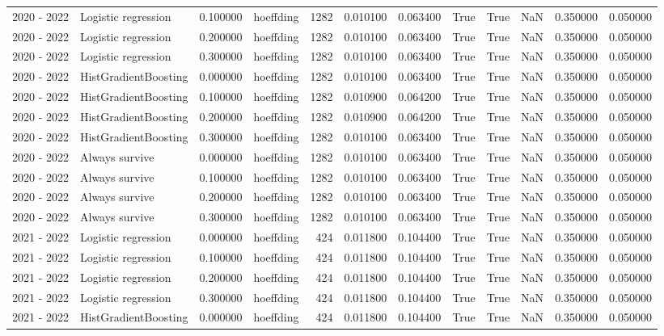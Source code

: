 \begin{tabular}{llrlrrrrrrrr}
2020 - 2022 & Logistic regression & 0.100000 & hoeffding & 1282 & 0.010100 & 0.063400 & True & True & NaN & 0.350000 & 0.050000 \\
2020 - 2022 & Logistic regression & 0.200000 & hoeffding & 1282 & 0.010100 & 0.063400 & True & True & NaN & 0.350000 & 0.050000 \\
2020 - 2022 & Logistic regression & 0.300000 & hoeffding & 1282 & 0.010100 & 0.063400 & True & True & NaN & 0.350000 & 0.050000 \\
2020 - 2022 & HistGradientBoosting & 0.000000 & hoeffding & 1282 & 0.010100 & 0.063400 & True & True & NaN & 0.350000 & 0.050000 \\
2020 - 2022 & HistGradientBoosting & 0.100000 & hoeffding & 1282 & 0.010900 & 0.064200 & True & True & NaN & 0.350000 & 0.050000 \\
2020 - 2022 & HistGradientBoosting & 0.200000 & hoeffding & 1282 & 0.010900 & 0.064200 & True & True & NaN & 0.350000 & 0.050000 \\
2020 - 2022 & HistGradientBoosting & 0.300000 & hoeffding & 1282 & 0.010100 & 0.063400 & True & True & NaN & 0.350000 & 0.050000 \\
2020 - 2022 & Always survive & 0.000000 & hoeffding & 1282 & 0.010100 & 0.063400 & True & True & NaN & 0.350000 & 0.050000 \\
2020 - 2022 & Always survive & 0.100000 & hoeffding & 1282 & 0.010100 & 0.063400 & True & True & NaN & 0.350000 & 0.050000 \\
2020 - 2022 & Always survive & 0.200000 & hoeffding & 1282 & 0.010100 & 0.063400 & True & True & NaN & 0.350000 & 0.050000 \\
2020 - 2022 & Always survive & 0.300000 & hoeffding & 1282 & 0.010100 & 0.063400 & True & True & NaN & 0.350000 & 0.050000 \\
2021 - 2022 & Logistic regression & 0.000000 & hoeffding & 424 & 0.011800 & 0.104400 & True & True & NaN & 0.350000 & 0.050000 \\
2021 - 2022 & Logistic regression & 0.100000 & hoeffding & 424 & 0.011800 & 0.104400 & True & True & NaN & 0.350000 & 0.050000 \\
2021 - 2022 & Logistic regression & 0.200000 & hoeffding & 424 & 0.011800 & 0.104400 & True & True & NaN & 0.350000 & 0.050000 \\
2021 - 2022 & Logistic regression & 0.300000 & hoeffding & 424 & 0.011800 & 0.104400 & True & True & NaN & 0.350000 & 0.050000 \\
2021 - 2022 & HistGradientBoosting & 0.000000 & hoeffding & 424 & 0.011800 & 0.104400 & True & True & NaN & 0.350000 & 0.050000 \\

\end{tabular}
